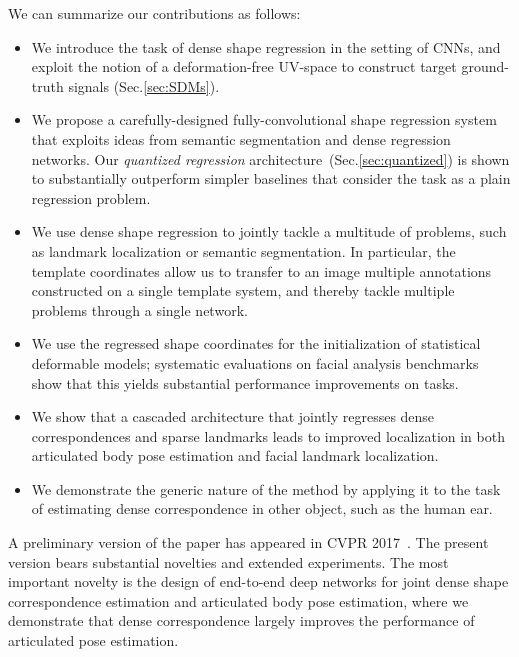 

We can summarize our contributions as follows:
\begin{itemize}
\item We introduce the task of dense shape regression in the setting of CNNs, and exploit the notion of a deformation-free UV-space to construct target ground-truth signals (Sec.\ref{sec:SDMs}).
\item We propose a carefully-designed fully-convolutional shape regression system that exploits ideas from semantic segmentation and dense regression networks. Our \textit{quantized regression} architecture~(Sec.\ref{sec:quantized}) is shown to substantially outperform simpler baselines that consider the task as a plain regression problem. 
\item We use dense shape regression to jointly tackle a multitude of problems, such as landmark localization or semantic segmentation.
In particular, the template coordinates allow us to transfer to an image multiple annotations constructed on a single template system, and thereby tackle multiple problems through a single network.
\item We use the regressed shape coordinates for the initialization of statistical deformable models; systematic evaluations on facial analysis benchmarks show that this yields substantial performance improvements  on tasks.
\item We  show that a cascaded architecture that jointly regresses dense correspondences and sparse landmarks leads to improved localization in both articulated body pose estimation and facial landmark localization. 
\item We  demonstrate the generic nature of the method by applying it to the task of estimating dense correspondence in other object, such as the human ear.
\end{itemize}
A preliminary version of the paper has appeared in CVPR 2017~\cite{guler2016densereg}. The present version bears substantial novelties and extended experiments. The most important novelty is the design of end-to-end deep networks for joint dense shape correspondence estimation and articulated body pose estimation, where we demonstrate that dense correspondence largely improves the performance of articulated pose estimation.
    
